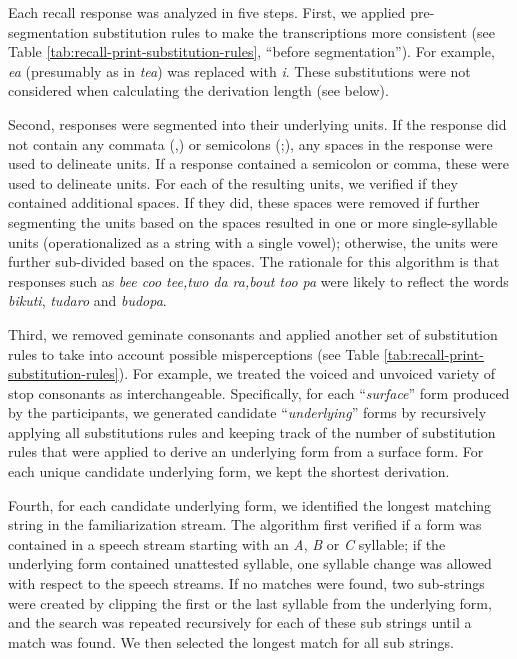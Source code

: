 \documentclass[]{article}
\begin{document}
Each recall response was analyzed in five steps. First, we applied pre-segmentation substitution rules to make the transcriptions more consistent (see Table \ref{tab:recall-print-substitution-rules}, ``before segmentation''). For example, \emph{ea} (presumably as in \emph{tea}) was replaced with \emph{i}. These substitutions were not considered when calculating the derivation length (see below).

Second, responses were segmented into their underlying units. If the response did not contain any commata (,) or semicolons (;), any spaces in the response were used to delineate units. If a response contained a semicolon or comma, these were used to delineate units. For each of the resulting units, we verified if they contained additional spaces. If they did, these spaces were removed if further segmenting the units based on the spaces resulted in one or more single-syllable units (operationalized as a string with a single vowel); otherwise, the units were further sub-divided based on the spaces. The rationale for this algorithm is that responses such as \emph{bee coo tee,two da ra,bout too pa} were likely to reflect the words \emph{bikuti}, \emph{tudaro} and \emph{budopa}.

Third, we removed geminate consonants and applied another set of substitution rules to take into account possible misperceptions (see Table \ref{tab:recall-print-substitution-rules}). For example, we treated the voiced and unvoiced variety of stop consonants as interchangeable. Specifically, for each ``\emph{surface}'' form produced by the participants, we generated candidate ``\emph{underlying}'' forms by recursively applying all substitutions rules and keeping track of the number of substitution rules that were applied to derive an underlying form from a surface form. For each unique candidate underlying form, we kept the shortest derivation.

Fourth, for each candidate underlying form, we identified the longest matching string in the familiarization stream. The algorithm first verified if a form was contained in a speech stream starting with an \emph{A}, \emph{B} or \emph{C} syllable; if the underlying form contained unattested syllable, one syllable change was allowed with respect to the speech streams. If no matches were found, two sub-strings were created by clipping the first or the last syllable from the underlying form, and the search was repeated recursively for each of these sub strings until a match was found. We then selected the longest match for all sub strings.
\end{document}

